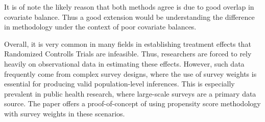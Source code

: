 \documentclass[12pt]{article}
\begin{document}
It is of note the likely reason that both methods agree is due to good overlap in covariate balance. Thus a good extension would be understanding the difference in methodology under the context of poor covariate balances. 

Overall, it is very common in many fields in establishing treatment effects that Randomized Controlls Trials are infeasible. Thus, researchers are forced to rely heavily on observational data in estimating these effects. However, such data frequently come from complex survey designs, where the use of survey weights is essential for producing valid population-level inferences. This is especially prevalent in public health research, where large-scale surveys are a primary data source. The paper offers a proof-of-concept of using propensity score methodology with survey weights in these scenarios. 
\end{document}
